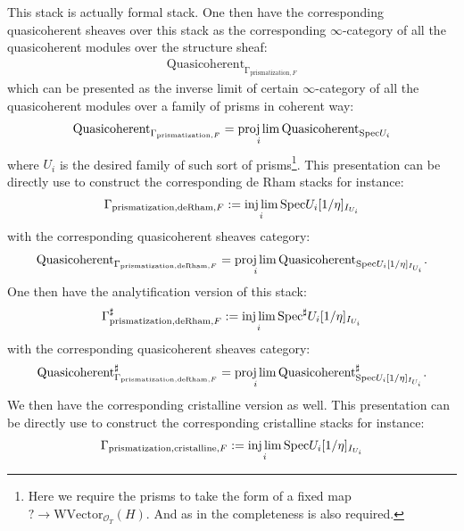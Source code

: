 \documentclass[12pt]{article}
\theoremstyle{definition}
\begin{document}
This stack is actually formal stack. One then have the corresponding quasicoherent sheaves over this stack as the corresponding $\infty$-category of all the quasicoherent modules over the structure sheaf:
\begin{align}
\mathrm{Quasicoherent}_{\mathrm{\Gamma}_{\mathrm{prismatization},F}}
\end{align}
which can be presented as the inverse limit of certain $\infty$-category of all the quasicoherent modules over a family of prisms in coherent way:
\begin{align}
\mathrm{Quasicoherent}_{\mathrm{\Gamma}_{\mathrm{prismatization},F}}=\projlim_i \mathrm{Quasicoherent}_{\mathrm{Spec}U_i}
\end{align}
where $U_i$ is the desired family of such sort of prisms\footnote{Here we require the prisms to take the form of a fixed map $?\rightarrow \mathrm{WVector}_{\mathcal{O}_T}(H)$. And as in \cite{BSI} the completeness is also required.}. This presentation can be directly use to construct the corresponding de Rham stacks for instance:
\begin{align}
\mathrm{\Gamma}_{\mathrm{prismatization},\mathrm{deRham},F}:=\injlim_i \mathrm{Spec}U_i[1/\eta]_{I_{U_i}}
\end{align}
with the corresponding quasicoherent sheaves category:
\begin{align}
\mathrm{Quasicoherent}_{\mathrm{\Gamma}_{\mathrm{prismatization},\mathrm{deRham},F}}=\projlim_i \mathrm{Quasicoherent}_{\mathrm{Spec}U_i[1/\eta]_{I_{U_i}}}.
\end{align}
One then have the analytification version of this stack:
\begin{align}
\mathrm{\Gamma}^\sharp_{\mathrm{prismatization},\mathrm{deRham},F}:=\injlim_i \mathrm{Spec}^\sharp U_i[1/\eta]_{I_{U_i}}
\end{align}
with the corresponding quasicoherent sheaves category:
\begin{align}
\mathrm{Quasicoherent}^\sharp_{\mathrm{\Gamma}_{\mathrm{prismatization},\mathrm{deRham},F}}=\projlim_i \mathrm{Quasicoherent}^\sharp_{\mathrm{Spec}U_i[1/\eta]_{I_{U_i}}}.
\end{align}
We then have the corresponding cristalline version as well. This presentation can be directly use to construct the corresponding cristalline stacks for instance:
\begin{align}
\mathrm{\Gamma}_{\mathrm{prismatization},\mathrm{cristalline},F}:=\injlim_i \mathrm{Spec}U_i[1/\eta]_{I_{U_i}}
\end{align}
\end{document}
